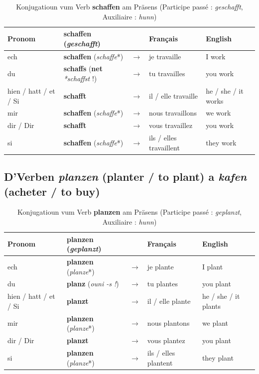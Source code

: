 \begin{table}[htbp]
    \centering
    \begin{tabular}{ll c l l}
        \toprule
        \textbf{Pronom} & \textbf{schaffen} (\textit{geschafft}) & & \textbf{Français} & \textbf{English} \\
        \midrule
        ech & \textbf{schaffen} (\textit{schaffe}*) & $\rightarrow$ & je travaille & I work \\
        du & \textbf{schaffs} (\textbf{net} \textit{*schaffst} !) & $\rightarrow$ & tu travailles & you work \\
        hien / hatt / et / Si & \textbf{schafft} & $\rightarrow$ & il / elle travaille & he / she / it works \\
        \midrule
        mir & \textbf{schaffen} (\textit{schaffe}*) & $\rightarrow$ & nous travaillons & we work \\
        dir / Dir & \textbf{schafft} & $\rightarrow$ & vous travaillez & you work \\
        si & \textbf{schaffen} (\textit{schaffe}*) & $\rightarrow$ & ils / elles travaillent & they work \\
        \bottomrule
    \end{tabular}
    \caption{Konjugatioun vum Verb \textbf{schaffen} am Präsens (Participe passé : \textit{geschafft}, Auxiliaire : \textit{hunn})}
\end{table}

\subsection{D'Verben \textit{planzen} (planter / to plant) a \textit{kafen} (acheter / to buy)}

\begin{table}[htbp]
    \centering
    \begin{tabular}{ll c l l}
        \toprule
        \textbf{Pronom} & \textbf{planzen} (\textit{geplanzt}) & & \textbf{Français} & \textbf{English} \\
        \midrule
        ech & \textbf{planzen} (\textit{planze}*) & $\rightarrow$ & je plante & I plant \\
        du & \textbf{planz} (\textit{ouni -s !}) & $\rightarrow$ & tu plantes & you plant \\
        hien / hatt / et / Si & \textbf{planzt} & $\rightarrow$ & il / elle plante & he / she / it plants \\
        \midrule
        mir & \textbf{planzen} (\textit{planze}*) & $\rightarrow$ & nous plantons & we plant \\
        dir / Dir & \textbf{planzt} & $\rightarrow$ & vous plantez & you plant \\
        si & \textbf{planzen} (\textit{planze}*) & $\rightarrow$ & ils / elles plantent & they plant \\
        \bottomrule
    \end{tabular}
    \caption{Konjugatioun vum Verb \textbf{planzen} am Präsens (Participe passé : \textit{geplanzt}, Auxiliaire : \textit{hunn})}
\end{table}

